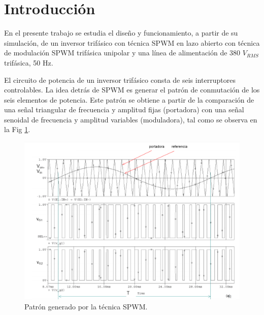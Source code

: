 \documentclass[11pt, a4paper]{article}
\begin{document}
	
	\tableofcontents


\section{Introducción}
En el presente trabajo se estudia el diseño y funcionamiento, a partir de su simulación, de un inversor trifásico con técnica SPWM en lazo abierto con técnica de modulación SPWM trifásica unipolar y una línea de alimentación de 380 $V_{RMS}$ trifásica, 50 Hz.


El circuito de potencia de un inversor trifásico consta de seis interruptores controlables. La idea detrás de SPWM es generar el patrón de conmutación de los seis elementos de potencia. Este patrón se obtiene a partir de la comparación de una señal triangular de frecuencia y amplitud fijas (portadora) con una señal senoidal de frecuencia y amplitud variables (moduladora), tal como se observa en la Fig \ref{fig:spwm}.

\begin{figure}[h]
	\centering
	\includegraphics[width=15cm]{Imagen/SPWM}
	\caption{Patrón generado por la técnica SPWM.}
	\label{fig:spwm}
\end{figure} 
\end{document}
